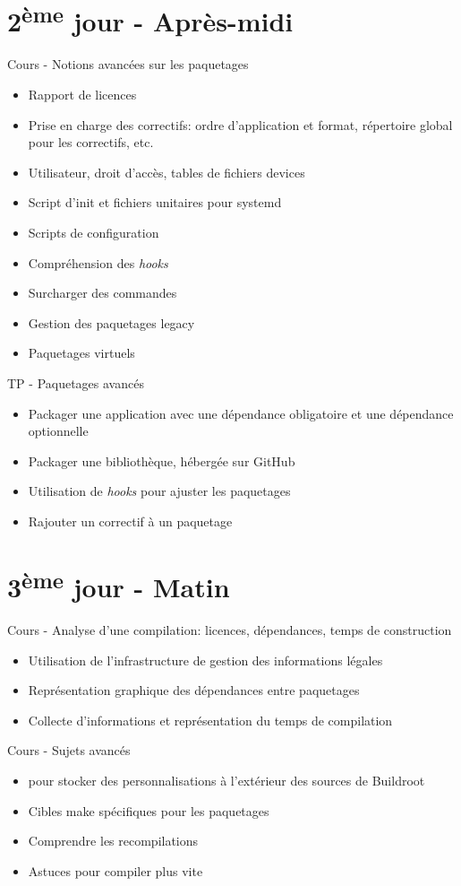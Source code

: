 \documentclass[a4paper,12pt,obeyspaces,spaces,hyphens]{article}
\begin{document}
\section{2\textsuperscript{ème} jour - Après-midi}

\feagendatwocolumn
{Cours - Notions avancées sur les paquetages}
{
  \begin{itemize}
  \item Rapport de licences
  \item Prise en charge des correctifs: ordre d'application et format,
	répertoire global pour les correctifs, etc.
  \item Utilisateur, droit d'accès, tables de fichiers devices
  \item Script d'init et fichiers unitaires pour systemd
  \item Scripts de configuration
  \item Compréhension des {\em hooks}
  \item Surcharger des commandes
  \item Gestion des paquetages legacy
  \item Paquetages virtuels
  \end{itemize}
}
{TP - Paquetages avancés}
{
  \begin{itemize}
  \item Packager une application avec une dépendance obligatoire et
    une dépendance optionnelle
  \item Packager une bibliothèque, hébergée sur GitHub
  \item Utilisation de {\em hooks} pour ajuster les paquetages
  \item Rajouter un correctif à un paquetage
  \end{itemize}
}

\section{3\textsuperscript{ème} jour - Matin}

\feagendatwocolumn
{Cours - Analyse d'une compilation: licences, dépendances, temps de
construction}
{
  \begin{itemize}
  \item Utilisation de l'infrastructure de gestion des informations
	légales
  \item Représentation graphique des dépendances entre paquetages
  \item Collecte d'informations et représentation du temps de
	compilation
  \end{itemize}
}
{Cours - Sujets avancés}
{
  \begin{itemize}
  \item {} pour stocker des personnalisations à
	l'extérieur des sources de Buildroot
  \item Cibles make spécifiques pour les paquetages
  \item Comprendre les recompilations
  \item Astuces pour compiler plus vite
  \end{itemize}
}
\end{document}
